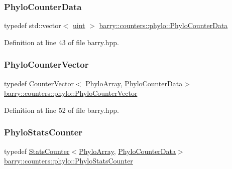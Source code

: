 \subsubsection{\texorpdfstring{Phylo\+Counter\+Data}{PhyloCounterData}}
{\footnotesize\ttfamily typedef std\+::vector$<$ \hyperlink{namespacebarry_a11dfc53ddb4672278319aa04f1e09a6c}{uint} $>$ \hyperlink{namespacebarry_1_1counters_1_1phylo_a6ecc0d8ab76f8dc2db152221a8e9e95a}{barry\+::counters\+::phylo\+::\+Phylo\+Counter\+Data}}



Definition at line 43 of file barry.\+hpp.

\mbox{\label{namespacebarry_1_1counters_1_1phylo_a2f117d1cd1dff67e1539cbc0aef5766a}} 
\subsubsection{\texorpdfstring{Phylo\+Counter\+Vector}{PhyloCounterVector}}
{\footnotesize\ttfamily typedef \hyperlink{classbarry_1_1_counter_vector}{Counter\+Vector}$<$ \hyperlink{namespacebarry_1_1counters_1_1phylo_a50a6652c16ff57d76b4099043d6a0bbb}{Phylo\+Array}, \hyperlink{namespacebarry_1_1counters_1_1phylo_a6ecc0d8ab76f8dc2db152221a8e9e95a}{Phylo\+Counter\+Data}$>$ \hyperlink{namespacebarry_1_1counters_1_1phylo_a2f117d1cd1dff67e1539cbc0aef5766a}{barry\+::counters\+::phylo\+::\+Phylo\+Counter\+Vector}}



Definition at line 52 of file barry.\+hpp.

\mbox{\label{namespacebarry_1_1counters_1_1phylo_abfefb6cff81a19d278b306a79cc011a3}} 
\subsubsection{\texorpdfstring{Phylo\+Stats\+Counter}{PhyloStatsCounter}}
{\footnotesize\ttfamily typedef \hyperlink{classbarry_1_1_stats_counter}{Stats\+Counter}$<$\hyperlink{namespacebarry_1_1counters_1_1phylo_a50a6652c16ff57d76b4099043d6a0bbb}{Phylo\+Array}, \hyperlink{namespacebarry_1_1counters_1_1phylo_a6ecc0d8ab76f8dc2db152221a8e9e95a}{Phylo\+Counter\+Data}$>$ \hyperlink{namespacebarry_1_1counters_1_1phylo_abfefb6cff81a19d278b306a79cc011a3}{barry\+::counters\+::phylo\+::\+Phylo\+Stats\+Counter}}



